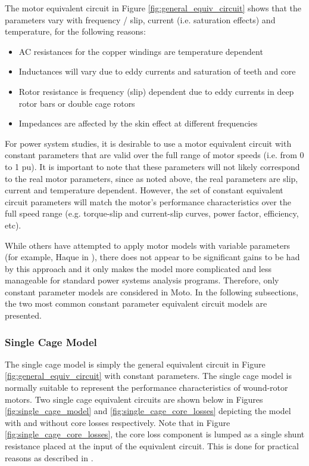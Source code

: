 \documentclass{article}
\begin{document}
The motor equivalent circuit in Figure \ref{fig:general_equiv_circuit} shows that the parameters vary with frequency / slip, current (i.e. saturation effects) and temperature, for the following reasons:

\begin{itemize}
  \item AC resistances for the copper windings are temperature dependent \cite{waters_1983}
  \item Inductances will vary due to eddy currents and saturation of teeth and core \cite{rogers_1987}
  \item Rotor resistance is frequency (slip) dependent due to eddy currents in deep rotor bars or double cage rotors \cite{boldea_2002}
  \item Impedances are affected by the skin effect at different frequencies \cite{boldea_2002}
\end{itemize}

For power system studies, it is desirable to use a motor equivalent circuit with constant parameters that are valid over the full range of motor speeds (i.e. from 0 to 1 pu). It is important to note that these parameters will not likely correspond to the real motor parameters, since as noted above, the real parameters are slip, current and temperature dependent. However, the set of constant equivalent circuit parameters will match the motor's performance characteristics over the full speed range (e.g. torque-slip and current-slip curves, power factor, efficiency, etc).

While others have attempted to apply motor models with variable parameters (for example, Haque in \cite{haque_2008}), there does not appear to be significant gains to be had by this approach and it only makes the model more complicated and less manageable for standard power systems analysis programs. Therefore, only constant parameter models are considered in Moto. In the following subsections, the two most common constant parameter equivalent circuit models are presented. 

\subsubsection{Single Cage Model}

The single cage model is simply the general equivalent circuit in Figure \ref{fig:general_equiv_circuit} with constant parameters. The single cage model is normally suitable to represent the performance characteristics of wound-rotor motors. Two single cage equivalent circuits are shown below in Figures \ref{fig:single_cage_model} and \ref{fig:single_cage_core_losses} depicting the model with and without core losses respectively. Note that in Figure \ref{fig:single_cage_core_losses}, the core loss component is lumped as a single shunt resistance placed at the input of the equivalent circuit. This is done for practical reasons as described in \cite{pedra_2008}.
\end{document}
